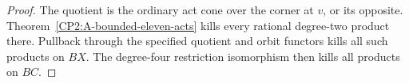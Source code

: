 \begin{proof}
The quotient is the ordinary act cone over the corner at
$v$, or its opposite. Theorem~\ref{CP2:A-bounded-eleven-acts}
kills every rational degree-two product there. Pullback
through the specified quotient and orbit functors kills
all such products on $BX$. The degree-four restriction
isomorphism then kills all products on $BC$.
\end{proof}
